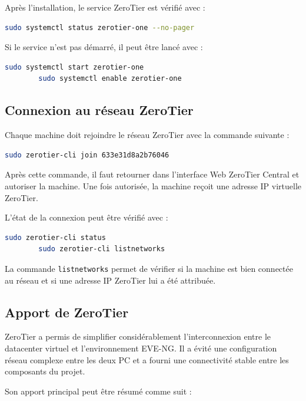\documentclass[12pt,a4paper,oneside]{report}
\begin{document}
	Après l'installation, le service ZeroTier est vérifié avec :
	
	\begin{lstlisting}[language=bash]
		sudo systemctl status zerotier-one --no-pager
	\end{lstlisting}
	
	Si le service n'est pas démarré, il peut être lancé avec :
	
	\begin{lstlisting}[language=bash]
		sudo systemctl start zerotier-one
		sudo systemctl enable zerotier-one
	\end{lstlisting}
	
	\subsection{Connexion au réseau ZeroTier}
	
	Chaque machine doit rejoindre le réseau ZeroTier avec la commande suivante :
	
	\begin{lstlisting}[language=bash]
		sudo zerotier-cli join 633e31d8a2b76046
	\end{lstlisting}
	
	Après cette commande, il faut retourner dans l'interface Web ZeroTier Central et autoriser la machine. Une fois autorisée, la machine reçoit une adresse IP virtuelle ZeroTier.
	
	L'état de la connexion peut être vérifié avec :
	
	\begin{lstlisting}[language=bash]
		sudo zerotier-cli status
		sudo zerotier-cli listnetworks
	\end{lstlisting}
	
	La commande \texttt{listnetworks} permet de vérifier si la machine est bien connectée au réseau et si une adresse IP ZeroTier lui a été attribuée.
	

	\subsection{Apport de ZeroTier}
	
	ZeroTier a permis de simplifier considérablement l'interconnexion entre le datacenter virtuel et l'environnement EVE-NG. Il a évité une configuration réseau complexe entre les deux PC et a fourni une connectivité stable entre les composants du projet.
	
	Son apport principal peut être résumé comme suit :
	
\end{document}
